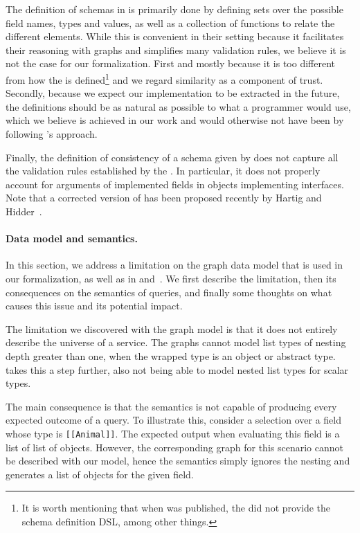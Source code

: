 The definition of \gql schemas in \HP is primarily done by defining sets over the possible field names, types and values, as well as a collection of functions to relate the different elements.
While this is convenient in their setting because it facilitates their reasoning with graphs and simplifies many validation rules, we believe it is not the case for our formalization.
First and mostly because it is too different from how the \spec is defined\footnote{It is worth mentioning that when \HP was published, the \spec did not provide the schema definition DSL, among other things.} and 
we regard similarity as a component of trust. Secondly, because we expect our implementation to be extracted in the future, the definitions should be as natural as possible to what
a programmer would use, which we believe is achieved in our work and would otherwise not have been by following \HP's  approach.

Finally,  the definition of consistency of a schema given by \HP does not capture all the validation rules established by the \spec. 
In particular, it does not properly account for arguments of implemented fields in objects implementing interfaces. 
Note that a corrected version of \HP has been proposed recently by Hartig and Hidder~\cite{olafschema}. 

\paragraph{Data model and semantics.}

In this section, we address a limitation on the graph data model that is used in our formalization, as well as in \HP and~\cite{olafschema}.
We first describe the limitation, then its consequences on the semantics of queries, and finally some thoughts on what causes this issue and
its potential impact.

The limitation we discovered with the graph model is that it does not entirely describe the universe of a \gql service. 
The graphs cannot model list types of nesting depth greater than one, when the wrapped type is an object or abstract type. 
\HP takes this a step further, also not being able to model nested list types for scalar types.

The main consequence is that the semantics is not capable of producing every expected outcome of a query. To illustrate this, 
consider a selection over a field whose type is \texttt{[[Animal]]}. 
The expected \gql output when evaluating this field is a list of list of objects.
However, the corresponding graph for this scenario cannot be described with our model, hence the semantics simply ignores the 
nesting and generates a list of objects for the given field.

